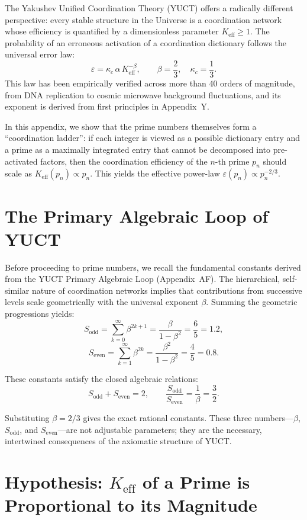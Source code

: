 \documentclass[12pt,a4paper]{article}
\theoremstyle{remark}
\newcommand{\kappac}{\kappa_c}
\newcommand{\Sodd}{S_{\mathrm{odd}}}
\newcommand{\Seven}{S_{\mathrm{even}}}
\begin{document}
	The Yakushev Unified Coordination Theory (YUCT) offers a radically different perspective: every stable structure in the Universe is a coordination network whose efficiency is quantified by a dimensionless parameter \(K_{\mathrm{eff}} \ge 1\). The probability of an erroneous activation of a coordination dictionary follows the universal error law:
	\[
	\varepsilon = \kappac \, \alpha \, K_{\mathrm{eff}}^{-\beta}, \qquad \beta = \frac{2}{3},\quad \kappac = \frac{1}{3}.
	\]
	This law has been empirically verified across more than 40 orders of magnitude, from DNA replication to cosmic microwave background fluctuations, and its exponent is derived from first principles in Appendix~Y.
	
	In this appendix, we show that the prime numbers themselves form a ``coordination ladder'': if each integer is viewed as a possible dictionary entry and a prime as a maximally integrated entry that cannot be decomposed into pre-activated factors, then the coordination efficiency of the \(n\)-th prime \(p_n\) should scale as \(K_{\mathrm{eff}}(p_n) \propto p_n\). This yields the effective power-law \(\varepsilon(p_n) \propto p_n^{-2/3}\).
	
	\section{The Primary Algebraic Loop of YUCT}
	\label{sec:algebraic-loop}
	
	Before proceeding to prime numbers, we recall the fundamental constants derived from the YUCT Primary Algebraic Loop (Appendix~AF). The hierarchical, self-similar nature of coordination networks implies that contributions from successive levels scale geometrically with the universal exponent \(\beta\). Summing the geometric progressions yields:
	\[
	\Sodd = \sum_{k=0}^{\infty} \beta^{2k+1} = \frac{\beta}{1-\beta^{2}} = \frac{6}{5} = 1.2,
	\]
	\[
	\Seven = \sum_{k=1}^{\infty} \beta^{2k} = \frac{\beta^{2}}{1-\beta^{2}} = \frac{4}{5} = 0.8.
	\]
	
	These constants satisfy the closed algebraic relations:
	\[
	\boxed{\Sodd + \Seven = 2, \qquad \frac{\Sodd}{\Seven} = \frac{1}{\beta} = \frac{3}{2}}.
	\]
	
	Substituting \(\beta = 2/3\) gives the exact rational constants. These three numbers---\(\beta\), \(\Sodd\), and \(\Seven\)---are not adjustable parameters; they are the necessary, intertwined consequences of the axiomatic structure of YUCT.
	
	\section{Hypothesis: \(K_{\mathrm{eff}}\) of a Prime is Proportional to its Magnitude}
	
\end{document}
